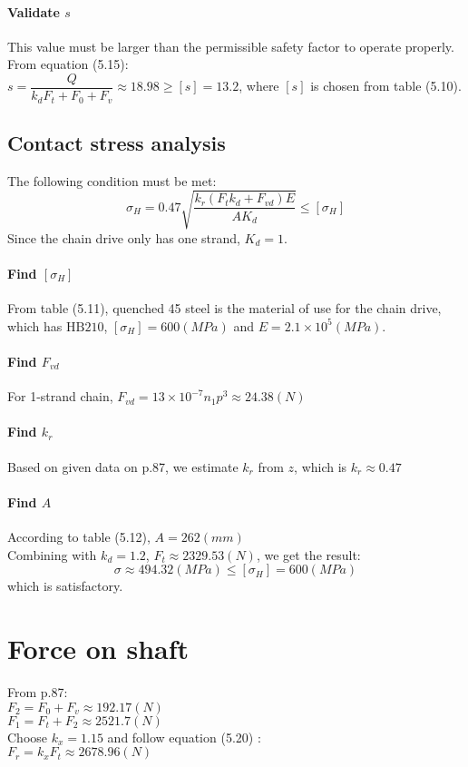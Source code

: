 \paragraph{Validate $ s $} This value must be larger than the permissible safety factor to operate properly.  From equation (5.15):\\ $ s = \dfrac{Q}{k_dF_t+F_0+F_v} \approx 18.98 \geq [s]=13.2 $, where $ [s] $ is chosen from table (5.10).
\subsection{Contact stress analysis}
The following condition must be met:
\[\sigma_H = 0.47\sqrt{\dfrac{k_r(F_tk_d+F_{vd})E}{AK_d}}\leq[\sigma_H]\]
Since the chain drive only has one strand, $ K_d = 1$.
\paragraph{Find $ [\sigma_H] $} From table (5.11), quenched 45 steel is the material of use for the chain drive, which has $ \text{HB}210 $, $ [\sigma_H] = 600 \unit{(MPa)} $ and $ E = 2.1\times10^5 \unit{(MPa)} $.
\paragraph{Find $ F_{vd} $} For 1-strand chain, $ F_{vd} = 13\times10^{-7}n_1p^3 \approx 24.38 \unit{(N)}$
\paragraph{Find $ k_r $} Based on given data on p.87, we estimate $ k_r $ from $ z $, which is $ k_r \approx 0.47$ 
\paragraph{Find $ A $} According to table (5.12), $ A = 262 \unit{(mm)} $\\
Combining with $ k_d = 1.2 $, $ F_t \approx 2329.53 \unit{(N)}$, we get the result:
\[\sigma \approx 494.32 \unit{(MPa)} \leq [\sigma_H] = 600 \unit{(MPa)}\]
which is satisfactory.

\section{Force on shaft}
From p.87:\\
$ F_2 = F_0 + F_v \approx 192.17 \unit{(N)}$\\
$ F_1 = F_t + F_2 \approx 2521.7 \unit{(N)}$\\
Choose $ k_x=1.15 $ and follow equation (5.20) :\\
$ F_r = k_xF_t \approx 2678.96\unit{(N)} $

